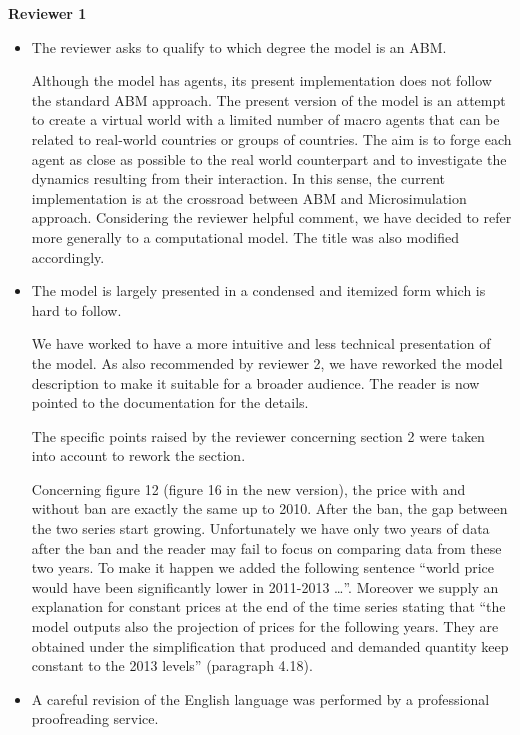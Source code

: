 \documentclass[a4paper,12pt]{article}
\begin{document}
\vskip1cm
\textbf{Reviewer 1}




\begin{itemize}
\item The reviewer asks to qualify to which degree the model is an ABM. 

Although the model has agents, its present implementation does not follow the standard ABM approach. 
The present version of the model is an attempt to create a virtual world with a limited number of macro agents that can be related to real-world countries or groups of countries. The aim is to forge each agent as close as possible to the real world counterpart and to investigate the dynamics resulting from their interaction. In this sense, the current implementation is at the crossroad between ABM and Microsimulation approach. 
Considering the reviewer helpful comment, we have decided to refer more generally to a computational model. The title was also modified accordingly.
\item The model is largely presented in a condensed and itemized form which is hard to follow.

    We have worked to have a more intuitive and less technical presentation of the model. As also recommended by reviewer 2, we have reworked the model description to make it suitable for a broader audience. The reader is now pointed to the documentation for the details. 
    
    The specific points raised by the reviewer concerning section 2 were taken into account to rework the section.

Concerning figure 12 (figure 16 in the new version), the price with and without ban are exactly the same up to 2010. After the ban, the gap between the two series start growing. 
Unfortunately we have only two years of data after the ban and the reader may fail to focus on comparing data from these two years. To make it happen we added the following sentence ``world price would have been significantly lower in 2011-2013 \ldots''. Moreover we supply an explanation for constant prices at the end of the time series stating that  ``the model outputs also the projection of prices for the following years. They are obtained under the simplification that produced and demanded quantity keep constant to the 2013 levels'' (paragraph 4.18).   

\item A careful revision of the English language was performed by a professional proofreading service.


\end{itemize}
\end{document}
